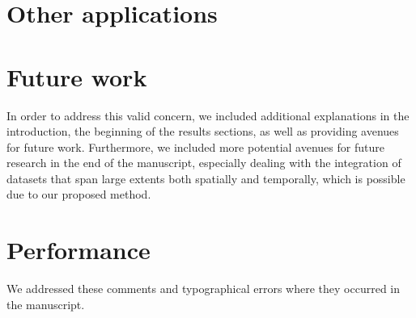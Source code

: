 \documentclass{article}
\begin{document}
\section{Other applications}\label{concern:applications}

\section{Future work}\label{concern:future-work}
In order to address this valid concern, we included additional explanations in the
introduction, the beginning of the results sections, as well as providing avenues for
future work. Furthermore, we included more potential avenues for future research in the
end of the manuscript, especially dealing with the integration of datasets that span large
extents both spatially and temporally, which is possible due to our proposed method.

\section{Performance}\label{concern:typos}
We addressed these comments and typographical errors where they occurred in the
manuscript.
\end{document}
